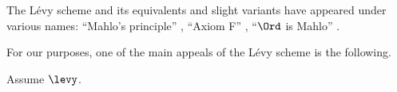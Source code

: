 \begin{nul}
	The Lévy scheme and its equivalents and slight variants
	have appeared under various names:
	\enquote{Mahlo's principle} \citep{Gloede1973},
	\enquote{Axiom F} \citep{Drake1974},
	\enquote{$ \Ord $ is Mahlo} \citep{Hamkins2003}.
\end{nul}

For our purposes,
one of the main appeals of the Lévy scheme
is the following.

\begin{theorem}
	Assume $ \levy $.
	
\end{theorem}


